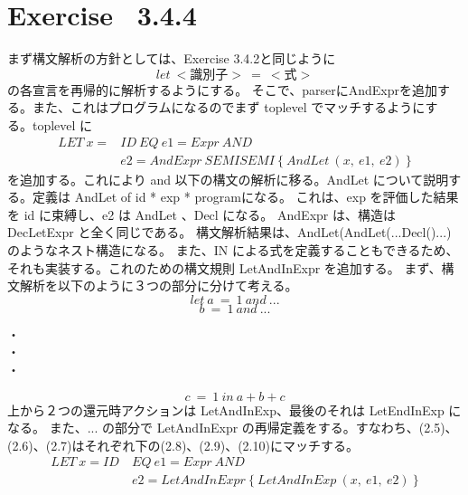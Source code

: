 \documentclass{jreport}
\begin{document}
		\section{Exercise \ 3.4.4}
			まず構文解析の方針としては、Exercise 3.4.2と同じように 
\begin{equation}let \ <識別子> \ = \ <式> \end{equation}
			の各宣言を再帰的に解析するようにする。
			そこで、parserにAndExprを追加する。また、これはプログラムになるのでまず toplevel でマッチするようにする。toplevel に	
\begin{equation} 
	\begin{split}
		LET \ x=&ID \ EQ \ e1=Expr \ AND \ \\ &e2=AndExpr \ SEMISEMI \ \{ \ AndLet \ (x, \ e1, \ e2) \ \} 
	\end{split}
\end{equation}
			を追加する。これにより and 以下の構文の解析に移る。AndLet について説明する。定義は AndLet of id * exp * programになる。
			これは、exp を評価した結果を id に束縛し、e2 は AndLet 、Decl になる。
			AndExpr は、構造は DecLetExpr と全く同じである。
			構文解析結果は、AndLet(AndLet(...Decl()...)のようなネスト構造になる。
			また、IN による式を定義することもできるため、それも実装する。これのための構文規則 LetAndInExpr を追加する。
			まず、構文解析を以下のように３つの部分に分けて考える。
\begin{equation}let \ a \ = \ 1 \ and \ ...	\end{equation}
\begin{equation}b \ = \ 1 \ and \ ... \end{equation}	
			\begin{center}
				・\\
				・\\
				・\\
			\end{center}
\begin{equation}c \ = \ 1 \ in \ a+b+c \end{equation}
			上から２つの還元時アクションは LetAndInExp、最後のそれは LetEndInExp になる。
			また、... の部分で LetAndInExpr の再帰定義をする。すなわち、(2.5)、(2.6)、(2.7)はそれぞれ下の(2.8)、(2.9)、(2.10)にマッチする。
\begin{equation}
	\begin{split}
		LET \ x=ID \ &EQ \ e1=Expr \ AND \ \\ &e2=LetAndInExpr \ \{ \ LetAndInExp \ (x, \ e1, \ e2) \ \}
	\end{split}
\end{equation}
\end{document}
